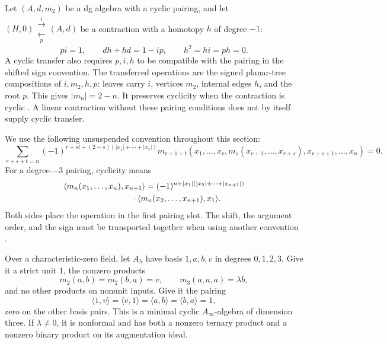Let $(A,d,m_2)$ be a dg algebra with a cyclic pairing, and let
$(H,0)\mathrel{\substack{\xrightarrow{\ i\ }\\[-.7ex]
                         \xleftarrow[\ p\ ]{}}}(A,d)$
be a contraction with a homotopy $h$ of degree $-1$:
\[
 pi=1,\qquad dh+hd=1-ip,\qquad h^2=hi=ph=0.
\]
A cyclic transfer also requires $p,i,h$ to be compatible with the
pairing in the shifted sign convention.  The transferred operations are
the signed planar-tree compositions of $i,m_2,h,p$: leaves carry $i$,
vertices $m_2$, internal edges $h$, and the root $p$.  This gives
$|m_n|=2-n$.  It preserves cyclicity when the contraction is cyclic
\cite{cycmp:HTT}.  A linear contraction without these pairing conditions
does not by itself supply cyclic transfer.

We use the following unsuspended convention throughout this section:
\begin{equation}\label{cyquant:eq:stasheff-sign}
 \sum_{r+s+t=n}
 (-1)^{r+st+(2-s)(|x_1|+\cdots+|x_r|)}
 m_{r+1+t}(x_1,\ldots,x_r,m_s(x_{r+1},\ldots,x_{r+s}),
                         x_{r+s+1},\ldots,x_n)=0.
\end{equation}
For a degree-$-3$ pairing, cyclicity means
\begin{equation}\label{cyquant:eq:cyclic-sign}
 \begin{aligned}
 \langle m_n(x_1,\ldots,x_n),x_{n+1}\rangle
  ={}&(-1)^{n+|x_1|(|x_2|+\cdots+|x_{n+1}|)}\\
 &\hspace{-3em}\cdot
 \langle m_n(x_2,\ldots,x_{n+1}),x_1\rangle.
 \end{aligned}
\end{equation}
Both sides place the operation in the first pairing slot.  The shift,
the argument order, and the sign must be transported together when using
another convention \cite[\S2]{cyquant:Cho}.

\begin{proposition}\label{cyquant:prop:quartic-model}
Over a characteristic-zero field, let $A_\lambda$ have basis $1,a,b,v$
in degrees $0,1,2,3$.  Give it a strict unit $1$, the nonzero products
\[
 m_2(a,b)=m_2(b,a)=v,\qquad m_3(a,a,a)=\lambda b,
\]
and no other products on nonunit inputs.  Give it the pairing
\[
 \langle1,v\rangle=\langle v,1\rangle
 =\langle a,b\rangle=\langle b,a\rangle=1,
\]
zero on the other basis pairs.  This is a minimal cyclic
$A_\infty$-algebra of dimension three.  If $\lambda\ne0$, it is
nonformal and has both a nonzero ternary product and a nonzero binary
product on its augmentation ideal.
\end{proposition}


